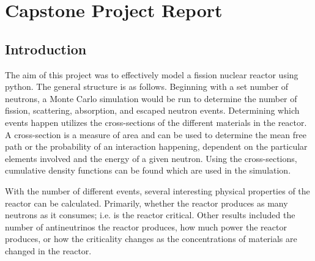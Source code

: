 \documentclass{notes}
\begin{document}
\section*{Capstone Project Report}

\subsection*{Introduction}

The aim of this project was to effectively model a fission nuclear reactor using python. The general structure is as follows. Beginning with a set number of neutrons, a Monte Carlo simulation would be run to determine the number of fission, scattering, absorption, and escaped neutron events. Determining which events happen utilizes the cross-sections of the different materials in the reactor. A cross-section is a measure of area and can be used to determine the mean free path or the probability of an interaction happening, dependent on the particular elements involved and the energy of a given neutron. Using the cross-sections, cumulative density functions can be found which are used in the simulation. 

With the number of different events, several interesting physical properties of the reactor can be calculated. Primarily, whether the reactor produces as many neutrons as it consumes; i.e. is the reactor critical. Other results included the number of antineutrinos the reactor produces, how much power the reactor produces, or how the criticality changes as the concentrations of materials are changed in the reactor.


\nocite{*}


\end{document}

